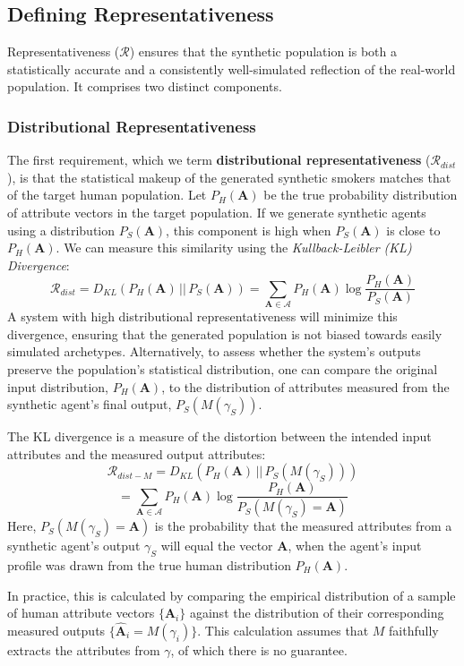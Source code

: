 \subsection{Defining Representativeness}

Representativeness ($\mathcal{R}$) ensures that the synthetic population is both a statistically accurate and a consistently well-simulated reflection of the real-world population. It comprises two distinct components.

\subsubsection{Distributional Representativeness}

The first requirement, which we term \textbf{distributional representativeness} ($\mathcal{R}_{dist}$), is that the statistical makeup of the generated synthetic smokers matches that of the target human population. Let $P_H(\textbf{A})$ be the true probability distribution of attribute vectors in the target population. If we generate synthetic agents using a distribution $P_S(\textbf{A})$, this component is high when $P_S(\textbf{A})$ is close to $P_H(\textbf{A})$. We can measure this similarity using the \emph{Kullback-Leibler (KL) Divergence}:
\[\mathcal{R}_{dist} = D_{KL}(P_H(\textbf{A}) \,||\, P_S(\textbf{A})) = \sum_{\textbf{A} \in \mathcal{A}} P_H(\textbf{A}) \log\frac{P_H(\textbf{A})}{P_S(\textbf{A})}\]
A system with high distributional representativeness will minimize this divergence, ensuring that the generated population is not biased towards easily simulated archetypes. Alternatively, to assess whether the system's outputs preserve the population's statistical distribution, one can compare the original input distribution, $P_H(\textbf{A})$, to the distribution of attributes measured from the synthetic agent's final output, $P_S(M(\gamma_S))$.

The KL divergence is a measure of the distortion between the intended input attributes and the measured output attributes:
\[\mathcal{R}_{dist-M} = D_{KL}(P_H(\textbf{A}) \,||\, P_S(M(\gamma_S)))\]
\[= \sum_{\textbf{A} \in \mathcal{A}} P_H(\textbf{A}) \log\frac{P_H(\textbf{A})}{P_S(M(\gamma_S)=\textbf{A})}\]
Here, $P_S(M(\gamma_S)=\textbf{A})$ is the probability that the measured attributes from a synthetic agent's output $\gamma_S$ will equal the vector $\textbf{A}$, when the agent's input profile was drawn from the true human distribution $P_H(\textbf{A})$.

In practice, this is calculated by comparing the empirical distribution of a sample of human attribute vectors $\{\textbf{A}_i\}$ against the distribution of their corresponding measured outputs $\{\hat{\textbf{A}}_i = M(\gamma_i)\}$. This calculation assumes that $M$ faithfully extracts the attributes from $\gamma$, of which there is no guarantee.


